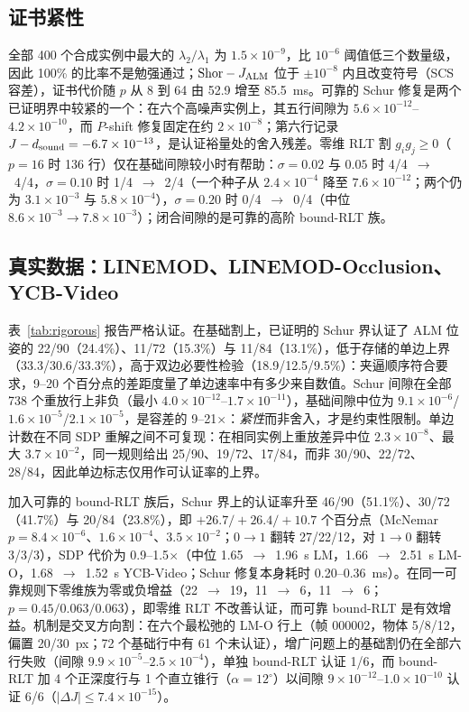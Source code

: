 \subsection{证书紧性}\label{sec:tight}
全部 400 个合成实例中最大的 $\lambda_2/\lambda_1$ 为 $1.5\times10^{-9}$，比 $10^{-6}$ 阈值低三个数量级，因此 100\% 的比率不是勉强通过；$\mathrm{Shor}-J_{\rm ALM}$ 位于 $\pm10^{-8}$ 内且改变符号（SCS 容差），证书代价随 $p$ 从 8 到 64 由 52.9 增至 85.5~ms。可靠的 Schur 修复是两个已证明界中较紧的一个：在六个高噪声实例上，其五行间隙为 $5.6\times10^{-12}$--$4.2\times10^{-10}$，而 $P$-shift 修复固定在约 $2\times10^{-8}$；第六行记录 $J-d_{\rm sound}=-6.7\times10^{-13}$，是认证裕量处的舍入残差。零维 RLT 割 $g_ig_j\ge0$（$p=16$ 时 136 行）仅在基础间隙较小时有帮助：$\sigma=0.02$ 与 $0.05$ 时 4/4~$\to$~4/4，$\sigma=0.10$ 时 1/4~$\to$~2/4（一个种子从 $2.4\times10^{-4}$ 降至 $7.6\times10^{-12}$；两个仍为 $3.1\times10^{-3}$ 与 $5.8\times10^{-4}$），$\sigma=0.20$ 时 0/4~$\to$~0/4（中位 $8.6\times10^{-3}\to7.8\times10^{-3}$）；闭合间隙的是可靠的高阶 bound-RLT 族。

\subsection{真实数据：LINEMOD、LINEMOD-Occlusion、YCB-Video}\label{sec:real}
表~\ref{tab:rigorous} 报告严格认证。在基础割上，已证明的 Schur 界认证了 ALM 位姿的 22/90（24.4\%）、11/72（15.3\%）与 11/84（13.1\%），低于存储的单边上界（33.3/30.6/33.3\%），高于双边必要性检验（18.9/12.5/9.5\%）：夹逼顺序符合要求，9--20 个百分点的差距度量了单边速率中有多少来自数值。Schur 间隙在全部 738 个重放行上非负（最小 $4.0\times10^{-12}$--$1.7\times10^{-11}$），基础间隙中位为 $9.1\times10^{-6}$/$1.6\times10^{-5}$/$2.1\times10^{-5}$，是容差的 9--21$\times$：\emph{紧性}而非舍入，才是约束性限制。单边计数在不同 SDP 重解之间不可复现：在相同实例上重放差异中位 $2.3\times10^{-8}$、最大 $3.7\times10^{-2}$，同一规则给出 25/90、19/72、17/84，而非 30/90、22/72、28/84，因此单边标志仅用作可认证率的上界。

加入可靠的 bound-RLT 族后，Schur 界上的认证率升至 46/90（51.1\%）、30/72（41.7\%）与 20/84（23.8\%），即 $+26.7/+26.4/+10.7$ 个百分点（McNemar $p=8.4\times10^{-6}$、$1.6\times10^{-4}$、$3.5\times10^{-2}$；$0\to1$ 翻转 27/22/12，对 $1\to0$ 翻转 3/3/3），SDP 代价为 0.9--1.5$\times$（中位 1.65~$\to$~1.96~s LM，1.66~$\to$~2.51~s LM-O，1.68~$\to$~1.52~s YCB-Video；Schur 修复本身耗时 0.20--0.36~ms）。在同一可靠规则下零维族为零或负增益（22~$\to$~19，11~$\to$~6，11~$\to$~6；$p=0.45/0.063/0.063$），即零维 RLT 不改善认证，而可靠 bound-RLT 是有效增益。机制是交叉方向割：在六个最松弛的 LM-O 行上（帧 000002，物体 5/8/12，偏置 20/30~px；72 个基础行中有 61 个未认证），增广问题上的基础割仍在全部六行失败（间隙 $9.9\times10^{-5}$--$2.5\times10^{-4}$），单独 bound-RLT 认证 1/6，而 bound-RLT 加 4 个正深度行与 1 个直立锥行（$\alpha=12^\circ$）以间隙 $9\times10^{-12}$--$1.0\times10^{-10}$ 认证 6/6（$|\Delta J|\le7.4\times10^{-15}$）。


